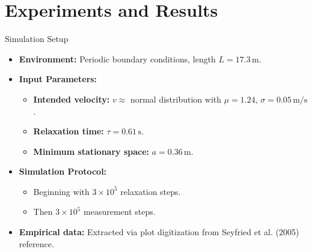 \documentclass{beamer}
\begin{document}
\section{Experiments and Results}
\begin{frame}{Simulation Setup}
\small
\begin{itemize}
    \item \textbf{Environment:} Periodic boundary conditions, length $L=17.3\,\mathrm{m}$.
    \item \textbf{Input Parameters:}
    \begin{itemize}
        \item \textbf{Intended velocity:} $v \approx$ normal distribution with $\mu=1.24$, $\sigma=0.05\,\mathrm{m/s}$.
        \item \textbf{Relaxation time:} $\tau=0.61\,\mathrm{s}$.
        \item \textbf{Minimum stationary space:} $a=0.36\,\mathrm{m}$.
    \end{itemize}
    \item \textbf{Simulation Protocol:}
    \begin{itemize}
        \item Beginning with $3\times10^5$ relaxation steps.
        \item Then $3\times10^5$ measurement steps.
    \end{itemize}
    \item \textbf{Empirical data:} Extracted via plot digitization from Seyfried et al. (2005) reference.
\end{itemize}
\end{frame}
\end{document}
